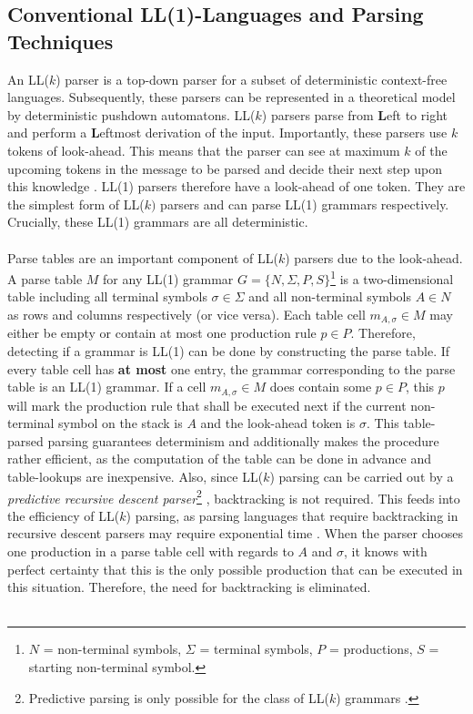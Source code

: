 \subsection{Conventional LL(1)-Languages and Parsing Techniques}
\label{3.2}
An LL($k$) parser is a top-down parser for a subset of deterministic context-free languages. Subsequently, these parsers can be represented in a theoretical model by deterministic pushdown automatons. LL($k$) parsers parse from \textbf{L}eft to right and perform a \textbf{L}eftmost derivation of the input. Importantly, these parsers use $k$ tokens of look-ahead. This means that the parser can see at maximum $k$ of the upcoming tokens in the message to be parsed and decide their next step upon this knowledge \cite{Parsing-Techniques-(lookahead)}. LL(1) parsers therefore have a look-ahead of one token. They are the simplest form of LL($k)$ parsers and can parse LL(1) grammars respectively. Crucially, these LL(1) grammars are all deterministic.
\\\\
Parse tables are an important component of LL($k$) parsers due to the look-ahead. A parse table $M$ for any LL(1) grammar $G=\{N,\Sigma,P,S\}$\footnote{$N$ = non-terminal symbols, $\Sigma$ = terminal symbols, $P$ = productions, $S$ = starting non-terminal symbol.} is a two-dimensional table including all terminal symbols $\sigma \in \Sigma$ and all non-terminal symbols $A \in N$ as rows and columns respectively (or vice versa). Each table cell $m_{A,\sigma} \in M$ may either be empty or contain at most one production rule $p \in P$. Therefore, detecting if a grammar is LL(1) can be done by constructing the parse table. If every table cell has \textbf{at most} one entry, the grammar corresponding to the parse table is an LL(1) grammar. If a cell $m_{A,\sigma} \in M$ does contain some $p \in P$, this $p$ will mark the production rule that shall be executed next if the current non-terminal symbol on the stack is $A$ and the look-ahead token is $\sigma$. This table-parsed parsing guarantees determinism and additionally makes the procedure rather efficient, as the computation of the table can be done in advance and table-lookups are inexpensive. Also, since LL($k$) parsing can be carried out by a \textit{predictive recursive descent parser}\footnote{Predictive parsing is only possible for the class of LL($k$) grammars \cite{recursive-descent-parser}.} \cite{recursive-descent-parser}, backtracking is not required. This feeds into the efficiency of LL($k$) parsing, as parsing languages that require backtracking in recursive descent parsers may require exponential time \cite{recursive-descent-parser}. When the parser chooses one production in a parse table cell with regards to $A$ and $\sigma$, it knows with perfect certainty that this is the only possible production that can be executed in this situation. Therefore, the need for backtracking is eliminated.\\\\
